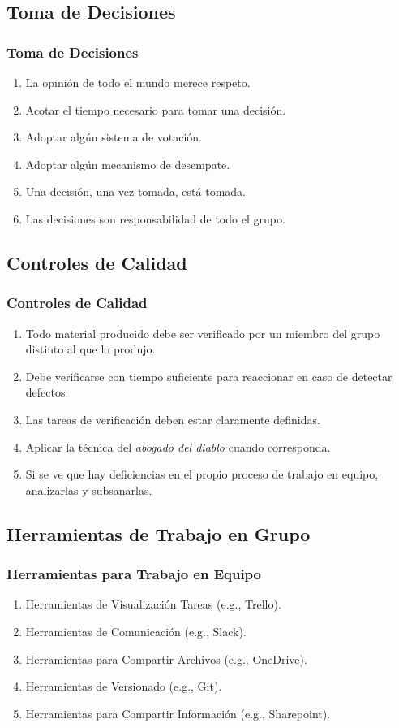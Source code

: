 \documentclass[a4paper,t,xcolor=pst,dvips]{beamer}
\begin{document}
\subsection{Toma de Decisiones}

\begin{frame}[c]
	\frametitle{Toma de Decisiones}
	\begin{enumerate}[<+->]
		\item La opinión de todo el mundo merece respeto.
		\item Acotar el tiempo necesario para tomar una decisión.
		\item Adoptar algún sistema de votación.
		\item Adoptar algún mecanismo de desempate.
		\item Una decisión, una vez tomada, está tomada.
		\item Las decisiones son responsabilidad de todo el grupo.
	\end{enumerate}
\end{frame}

\subsection{Controles de Calidad}

\begin{frame}[c]
	\frametitle{Controles de Calidad}
	\begin{enumerate}[<+->]
		\item Todo material producido debe ser verificado por un miembro del grupo distinto al que lo produjo.
		\item Debe verificarse con tiempo suficiente para reaccionar en caso de detectar defectos.
		\item Las tareas de verificación deben estar claramente definidas.
		\item Aplicar la técnica del \emph{abogado del diablo} cuando corresponda.
		\item Si se ve que hay deficiencias en el propio proceso de trabajo en equipo, analizarlas y subsanarlas.
	\end{enumerate}
\end{frame}

\subsection{Herramientas de Trabajo en Grupo}

\begin{frame}[c]
	\frametitle{Herramientas para Trabajo en Equipo}
	\begin{enumerate}[<+->]
		\item Herramientas de Visualización Tareas (e.g., Trello).
		\item Herramientas de Comunicación (e.g., Slack).
		\item Herramientas para Compartir Archivos (e.g., OneDrive).
		\item Herramientas de Versionado (e.g., Git).
		\item Herramientas para Compartir Información (e.g., Sharepoint).
	\end{enumerate}
\end{frame}
\end{document}
